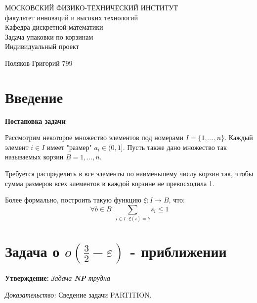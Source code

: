 \documentclass[a4paper,14pt,russian]{article}
\begin{document}
\begin{center}
\hfill \break
\large{МОСКОВСКИЙ ФИЗИКО-ТЕХНИЧЕСКИЙ ИНСТИТУТ}\\
\hfill \break
\normalsize{факультет инноваций и высоких технологий}\\
 \hfill \break
\normalsize{Кафедра дискретной математики}\\
\hfill\break
\hfill \break
\hfill \break
\hfill \break
\vfill
\Large{Задача упаковки по корзинам}\\
\hfill \break
\hfill \break
\large{Индивидуальный проект}

\hfill \break
\hfill \break

\end{center}
 
\hfill \break
\vfill

\hfill
\large{Поляков Григорий 799}
\break


\thispagestyle{empty} 
 
 
\newpage
     
\newpage
 
\newpage
\section{Введение}

{\large \bf Постановка задачи}

Рассмотрим некоторое множество элементов под номерами $I = \{1, ..., n\}$. Каждый элемент $i \in I$ имеет "размер" $a_i \in (0, 1]$. Пусть также дано множество так называемых корзин $B = {1, ..., n}$. 

Требуется распределить в все элементы по наименьшему числу корзин так, чтобы сумма размеров всех элементов в каждой корзине не превосходила 1.

Более формально, построить такую функцию $\xi : I \rightarrow B$, что: $$\forall b \in B \:\: \sum_{i \in I \: : \xi(i) = b} s_i \leq 1$$

\newpage
\section {Задача о $o(\frac{3}{2} - \varepsilon)$ - приближении}

{\bf Утверждение:} \textit{Задача {\bf NP}-трудна}

\textit{Доказательство:} Сведение задачи PARTITION.
\end{document}

